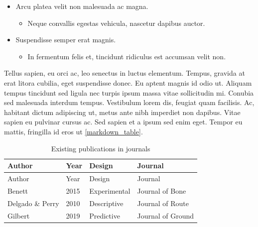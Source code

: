 \documentclass[
  12,
]{article}
\providecommand{\tightlist}{%
  \setlength{\itemsep}{0pt}\setlength{\parskip}{0pt}}
\begin{document}
\begin{itemize}
\tightlist
\item
  Arcu platea velit non malesuada ac magna.

  \begin{itemize}
  \tightlist
  \item
    Neque convallis egestas vehicula, nascetur dapibus auctor.\\
  \end{itemize}
\item
  Suspendisse semper erat magnis.

  \begin{itemize}
  \tightlist
  \item
    In fermentum felis et, tincidunt ridiculus est accumsan velit non.
  \end{itemize}
\end{itemize}

Tellus sapien, eu orci ac, leo senectus in luctus elementum. Tempus,
gravida at erat litora cubilia, eget suspendisse donec. Eu aptent magnis
id odio ut. Aliquam tempus tincidunt sed ligula nec turpis ipsum massa
vitae sollicitudin mi. Conubia sed malesuada interdum tempus. Vestibulum
lorem dis, feugiat quam facilisis. Ac, habitant dictum adipiscing ut,
metus ante nibh imperdiet non dapibus. Vitae sapien eu pulvinar cursus
ac. Sed sapien et a ipsum sed enim eget. Tempor eu mattis, fringilla id
eros ut \autoref{markdown_table}.

\begin{longtable}[]{@{}llll@{}}
\caption{Existing publications in journals
\label{markdown_table}}\tabularnewline
\toprule()
Author & Year & Design & Journal \\
\midrule()
\endfirsthead
\toprule()
Author & Year & Design & Journal \\
\midrule()
\endhead
Benett & 2015 & Experimental & Journal of Bone \\
Delgado \& Perry & 2010 & Descriptive & Journal of Route \\
Gilbert & 2019 & Predictive & Journal of Ground \\
\bottomrule()
\end{longtable}
\end{document}
